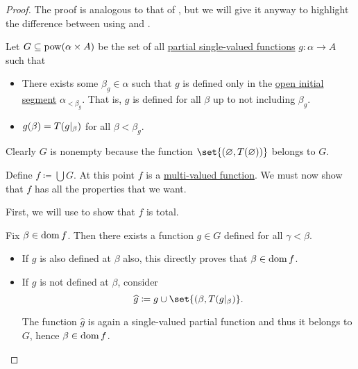 \begin{proof}
  The proof is analogous to that of , but we will give it anyway to highlight the difference between using  and .

  Let \( G \subseteq \operatorname{pow}(\alpha \times A) \) be the set of all \hyperref[def:partial_function]{partial single-valued functions} \( g: \alpha \to A \) such that
  \begin{itemize}
    \item There exists some \( \beta_g \in \alpha \) such that \( g \) is defined only in the \hyperref[def:partially_ordered_set_interval/ray]{open initial segment} \( \alpha_{< \beta_g} \). That is, \( g \) is defined for all \( \beta \) up to not including \( \beta_g \).

    \item \( g(\beta) = T(g\vert_\beta) \) for all \( \beta < \beta_g \).
  \end{itemize}

  Clearly \( G \) is nonempty because the function \( \set{ (\varnothing, T(\varnothing)) } \) belongs to \( G \).

  Define \( f \coloneqq \bigcup G \). At this point \( f \) is a \hyperref[def:multi_valued_function]{multi-valued function}. We must now show that \( f \) has all the properties that we want.

   First, we will use  to show that \( f \) is total.

  Fix \( \beta \in \operatorname{dom} f \). Then there exists a function \( g \in G \) defined for all \( \gamma < \beta \).

  \begin{itemize}
    \item If \( g \) is also defined at \( \beta \) also, this directly proves that \( \beta \in \operatorname{dom} f \).
    \item If \( g \) is not defined at \( \beta \), consider
    \begin{equation*}
      \widehat g \coloneqq g \cup \set{ (\beta, T(g\restr_\beta) }.
    \end{equation*}

    The function \( \widehat g \) is again a single-valued partial function and thus it belongs to \( G \), hence \( \beta \in \operatorname{dom} f \).
  \end{itemize}


\end{proof}
